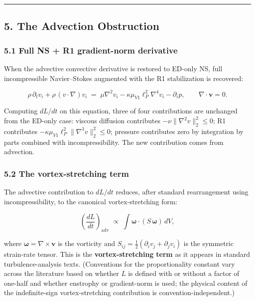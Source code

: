 \documentclass[
]{article}
\begin{document}
\begin{center}\rule{0.5\linewidth}{0.5pt}\end{center}

\subsection{5. The Advection
Obstruction}\label{the-advection-obstruction}

\subsubsection{5.1 Full NS + R1 gradient-norm
derivative}\label{full-ns-r1-gradient-norm-derivative}

When the advective convective derivative is restored to ED-only NS, full
incompressible Navier--Stokes augmented with the R1 stabilization is
recovered:

\[\rho\,\partial_t v_i + \rho\,(v \cdot \nabla)v_i \;=\; \mu\nabla^2 v_i - \kappa\mu_{V1}\ell_P^2\nabla^4 v_i - \partial_i p, \qquad \nabla \cdot \mathbf{v} = 0.\]

Computing \(dL/dt\) on this equation, three of four contributions are
unchanged from the ED-only case: viscous diffusion contributes
\(-\nu \|\nabla^2 v\|_2^2 \le 0\); R1 contributes
\(-\kappa\mu_{V1}\ell_P^2 \|\nabla^3 v\|_2^2 \le 0\); pressure
contributes zero by integration by parts combined with
incompressibility. The new contribution comes from advection.

\subsubsection{5.2 The vortex-stretching
term}\label{the-vortex-stretching-term}

The advective contribution to \(dL/dt\) reduces, after standard
rearrangement using incompressibility, to the canonical
vortex-stretching form:

\[\left(\frac{dL}{dt}\right)_\mathrm{adv} \;\propto\; \int \boldsymbol{\omega} \cdot (S\, \boldsymbol{\omega}) \, dV,\]

where \(\boldsymbol{\omega} = \nabla \times \mathbf{v}\) is the
vorticity and \(S_{ij} = \frac{1}{2}(\partial_i v_j + \partial_j v_i)\)
is the symmetric strain-rate tensor. This is the
\textbf{vortex-stretching term} as it appears in standard
turbulence-analysis texts. (Conventions for the proportionality constant
vary across the literature based on whether \(L\) is defined with or
without a factor of one-half and whether enstrophy or gradient-norm is
used; the physical content of the indefinite-sign vortex-stretching
contribution is convention-independent.)
\end{document}
